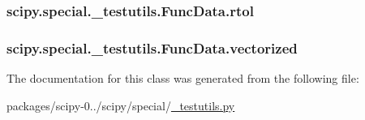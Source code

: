 \subsubsection[{rtol}]{\setlength{\rightskip}{0pt plus 5cm}scipy.\+special.\+\_\+testutils.\+Func\+Data.\+rtol}\label{classscipy_1_1special_1_1__testutils_1_1FuncData_ab2e78968b9b5a66db6605f3515905510}
\hypertarget{classscipy_1_1special_1_1__testutils_1_1FuncData_a15b7c53bd4d9894489163394d32efa14}{}
\subsubsection[{vectorized}]{\setlength{\rightskip}{0pt plus 5cm}scipy.\+special.\+\_\+testutils.\+Func\+Data.\+vectorized}\label{classscipy_1_1special_1_1__testutils_1_1FuncData_a15b7c53bd4d9894489163394d32efa14}


The documentation for this class was generated from the following file\+:\begin{DoxyCompactItemize}
\item 
packages/scipy-\/0../scipy/special/\hyperlink{special_2__testutils_8py}{\+\_\+testutils.\+py}\end{DoxyCompactItemize}
